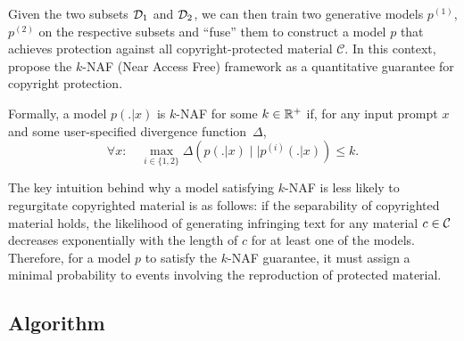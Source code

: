 Given the two subsets $\mathcal D_1$ and $\mathcal D_2$, we can then train two generative models $p^{(1)}$, $p^{(2)}$ on the respective subsets and ``fuse'' them to construct a model $p$ that achieves protection against all copyright-protected material $\mathcal{C}$. In this context, \citet{vyas2023provable} propose the $k$-NAF (Near Access Free) framework as a quantitative guarantee for copyright protection. 
\begin{definition}
\label{def:knaf}
Formally, a model $ p(. | x)$ is $k$-NAF for some $k\in \mathbb{R}^+$ if, for any input prompt $x$ and some user-specified divergence function~$\Delta$,
\begin{equation}\label{eq:minkl}
  \forall x: \quad  \max_{i \in \{1,2\}} \Delta( p(. | x) \mid\mid p^{(i)}(. | x)) \leq k.
\end{equation}
\end{definition}
The key intuition behind why a model satisfying $k$-NAF is less likely to regurgitate copyrighted material is as follows: if the separability of copyrighted material holds, the likelihood of generating infringing text for any material $c \in \mathcal C$ decreases exponentially with the length of $c$ for at least one of the models. Therefore, for a model $p$ to satisfy the $k$-NAF guarantee, it must assign a minimal probability to events involving the reproduction of protected material.



\subsection{Algorithm}
\label{sec:algo}

